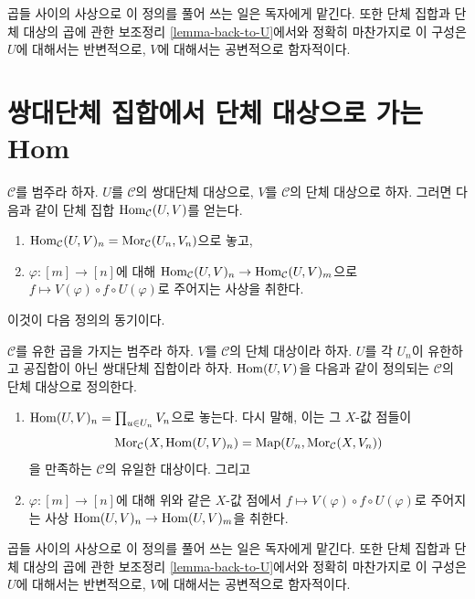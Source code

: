 \noindent
곱들 사이의 사상으로 이 정의를 풀어 쓰는 일은 독자에게 맡긴다.
또한 단체 집합과 단체 대상의 곱에 관한 보조정리
\ref{lemma-back-to-U}에서와 정확히 마찬가지로 이 구성은
$U$에 대해서는 반변적으로, $V$에 대해서는 공변적으로 함자적이다.




\section{쌍대단체 집합에서 단체 대상으로 가는 Hom}
\label{section-hom-from-cosimplicial-sets-into-simplicial}

\noindent
$\mathcal{C}$를 범주라 하자. $U$를 $\mathcal{C}$의 쌍대단체 대상으로,
$V$를 $\mathcal{C}$의 단체 대상으로 하자.
그러면 다음과 같이 단체 집합 $\mathop{\mathrm{Hom}}\nolimits_\mathcal{C}(U, V)$를 얻는다.
\begin{enumerate}
\item $\mathop{\mathrm{Hom}}\nolimits_\mathcal{C}(U, V)_n = \mathop{\mathrm{Mor}}\nolimits_\mathcal{C}(U_n, V_n)$으로 놓고,
\item $\varphi : [m] \to [n]$에 대해
$\mathop{\mathrm{Hom}}\nolimits_\mathcal{C}(U, V)_n \to \mathop{\mathrm{Hom}}\nolimits_\mathcal{C}(U, V)_m$으로
$f \mapsto V(\varphi) \circ f \circ U(\varphi)$로 주어지는 사상을 취한다.
\end{enumerate}
이것이 다음 정의의 동기이다.

\begin{definition}
\label{definition-hom-deltak-simplicial}
$\mathcal{C}$를 유한 곱을 가지는 범주라 하자.
$V$를 $\mathcal{C}$의 단체 대상이라 하자.
$U$를 각 $U_n$이 유한하고 공집합이 아닌 쌍대단체 집합이라 하자.
{{\it $\mathop{\mathrm{Hom}}\nolimits(U, V)$}}을 다음과 같이 정의되는
$\mathcal{C}$의 단체 대상으로 정의한다.
\begin{enumerate}
\item $\mathop{\mathrm{Hom}}\nolimits(U, V)_n = \prod_{u \in U_n} V_n$으로 놓는다.
다시 말해, 이는 그 $X$-값 점들이
$$
\mathop{\mathrm{Mor}}\nolimits_\mathcal{C}(X, \mathop{\mathrm{Hom}}\nolimits(U, V)_n)
=
\text{Map}(U_n, \mathop{\mathrm{Mor}}\nolimits_\mathcal{C}(X, V_n))
$$
을 만족하는 $\mathcal{C}$의 유일한 대상이다. 그리고
\item $\varphi : [m] \to [n]$에 대해 위와 같은 $X$-값 점에서
$f \mapsto V(\varphi) \circ f \circ U(\varphi)$로 주어지는 사상
$\mathop{\mathrm{Hom}}\nolimits(U, V)_n \to \mathop{\mathrm{Hom}}\nolimits(U, V)_m$을 취한다.
\end{enumerate}
\end{definition}

\noindent
곱들 사이의 사상으로 이 정의를 풀어 쓰는 일은 독자에게 맡긴다.
또한 단체 집합과 단체 대상의 곱에 관한 보조정리
\ref{lemma-back-to-U}에서와 정확히 마찬가지로 이 구성은
$U$에 대해서는 반변적으로, $V$에 대해서는 공변적으로 함자적이다.

